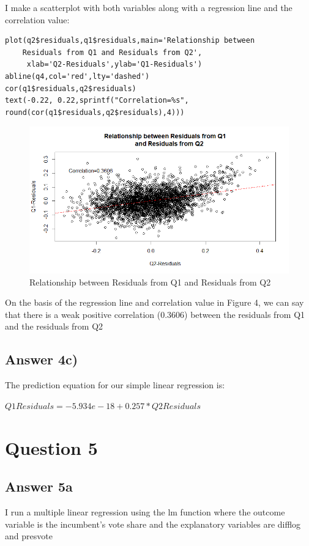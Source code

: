 \documentclass{article}
\begin{document}
I make a scatterplot with both variables along with a regression line and the correlation value:
\begin{verbatim}
plot(q2$residuals,q1$residuals,main='Relationship between 
    Residuals from Q1 and Residuals from Q2',
     xlab='Q2-Residuals',ylab='Q1-Residuals')
abline(q4,col='red',lty='dashed')
cor(q1$residuals,q2$residuals)
text(-0.22, 0.22,sprintf("Correlation=%s", round(cor(q1$residuals,q2$residuals),4)))
\end{verbatim}

\begin{figure} [h!] %
    \centering
    \includegraphics[width=1.3\textwidth]{Q4PS3.png}
    \caption{Relationship between Residuals from Q1 
    and Residuals from Q2}
    \label{}
\end{figure}
On the basis of the regression line and correlation value in Figure 4, we can say that there is a weak positive correlation (0.3606) between the residuals from Q1 and the residuals from Q2

\subsection{Answer 4c)}
The prediction equation for our simple linear regression is:

\begin{math}
    Q1Residuals = -5.934e-18 + 0.257 * Q2 Residuals 
\end{math}


\section{Question 5}
\subsection{Answer 5a}
I run a multiple linear regression using the lm function where the outcome variable is the incumbent's vote share and the explanatory variables are difflog and presvote
\end{document}
